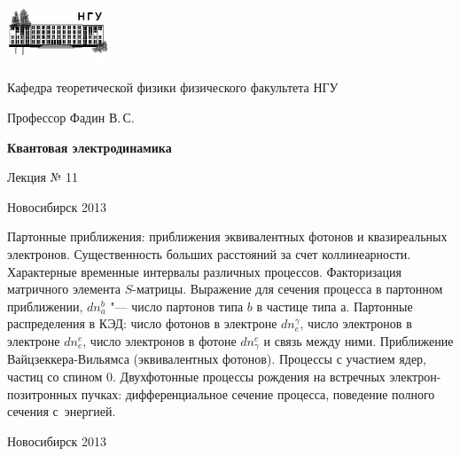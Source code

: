 \documentclass[12pt,pagesize,paper=192mm:108mm]{scrbook}
\begin{document}
\begin{titlepage}
  \vspace*{-1em}
  \begin{center}
    \includegraphics[width=0.23\textwidth]{../NSU-logo}

    Кафедра теоретической физики физического факультета НГУ
    \medskip

    \Large
    Профессор Фадин В.\,С.
    \bigskip

    \huge
    \textbf{Квантовая электродинамика}
    \bigskip

    \Large
    Лекция № 11
    \vfill

    \normalsize
    \vfill

    \normalsize \ccbysa\hspace{0.5em}  Новосибирск 2013
  \end{center}
\end{titlepage}
\vspace*{-1em}
\begin{center}
\vfill
  \begin{minipage}{0.65\linewidth}
    Партонные приближения: приближения эквивалентных фотонов и
    квазиреальных электронов.  Существенность больших расстояний за
    счет коллинеарности. Характерные временные интервалы различных
    процессов. Факторизация матричного элемента $S$-матрицы. Выражение
    для сечения процесса в партонном приближении, $dn_a^b$ "--- число
    партонов типа $b$ в частице типа $а$. Партонные распределения в
    КЭД: число фотонов в электроне $dn_e^\gamma$, число электронов в
    электроне $dn_e^e$, число электронов в фотоне $dn_\gamma^e$ и
    связь между ними. Приближение Вайцзеккера-Вильямса (эквивалентных
    фотонов). Процессы с участием ядер, частиц со спином
    0. Двухфотонные процессы рождения на встречных
    электрон-позитронных пучках: дифференциальное сечение процесса,
    поведение полного сечения с~энергией.
  \end{minipage}
  \vfill

  \normalsize \ccbysa\hspace{0.5em} Новосибирск 2013
\end{center}
\end{document}
